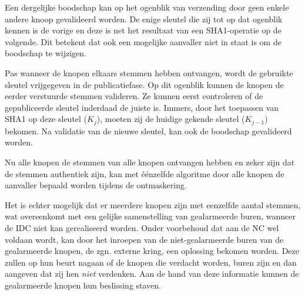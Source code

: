Een dergelijke boodschap kan op het ogenblik van verzending door geen enkele
andere knoop gevalideerd worden. De enige sleutel die zij tot op dat ogenblik
kennen is de vorige en deze is net het resultaat van een SHA1-operatie op de
volgende. Dit betekent dat ook een mogelijke aanvaller niet in staat is om de
boodschap te wijzigen.

Pas wanneer de knopen elkaars stemmen hebben ontvangen, wordt de gebruikte
sleutel vrijgegeven in de publicatiefase. Op dit ogenblik kunnen de knopen de
eerder verstuurde stemmen valideren. Ze kunnen eerst controleren of de
gepubliceerde sleutel inderdaad de juiste is. Immers, door het toepassen van
SHA1 op deze sleutel ($K_j$), moeten zij de huidige gekende sleutel ($K_{j-1}$)
bekomen. Na validatie van de nieuwe sleutel, kan ook de boodschap gevalideerd
worden.

Nu alle knopen de stemmen van alle knopen ontvangen hebben en zeker zijn dat de
stemmen authentiek zijn, kan met \'e\'enzelfde algoritme door alle knopen de
aanvaller bepaald worden tijdens de ontmaskering.

Het is echter mogelijk dat er meerdere knopen zijn met eenzelfde aantal
stemmen, wat overeenkomt met een gelijke samenstelling van gealarmeerde buren,
wanneer de IDC niet kan gerealiseerd worden. Onder voorbehoud dat aan de NC wel
voldaan wordt, kan door het inroepen van de niet-gealarmeerde buren van de
gealarmeerde knopen, de zgn. externe kring, een oplossing bekomen worden. Deze
zullen op hun beurt nagaan of de knopen die verdacht worden, buren zijn en dan
aangeven dat zij hen \emph{niet} verdenken. Aan de hand van deze informatie
kunnen de gealarmeerde knopen hun beslissing staven.
